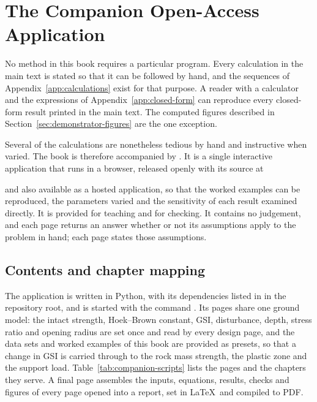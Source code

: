 \chapter{The Companion Open-Access Application}
\label{app:software}

No method in this book requires a particular program. Every calculation in the
main text is stated so that it can be followed by hand, and the sequences of
Appendix~\ref{app:calculations} exist for that purpose. A reader with a calculator and the
expressions of Appendix~\ref{app:closed-form} can reproduce every closed-form
result printed in the main text. The computed figures described in
Section~\ref{sec:demonstrator-figures} are the one exception.

Several of the calculations are nonetheless tedious by hand and instructive when
varied. The book is therefore accompanied by \companionname. It is a single
interactive application that runs in a browser, released openly with its
source at

\begin{center}
\companionlink
\end{center}

\noindent and also available as a hosted application, so that the worked
examples can be reproduced, the parameters varied and the sensitivity of each
result examined directly. It is provided for teaching and for checking. It
contains no judgement, and each page returns an answer whether or not its
assumptions apply to the problem in hand; each page states those assumptions.

\section{Contents and chapter mapping}
\label{sec:companion-contents}

The application is written in Python, with its dependencies listed in
 in the repository root, and is started with the
command . Its pages share one ground model:
the intact strength, Hoek--Brown constant, GSI, disturbance, depth, stress
ratio and opening radius are set once and read by every design page, and the
data sets and worked examples of this book are provided as presets, so that a
change in GSI is carried through to the rock mass strength, the plastic zone
and the support load. Table~\ref{tab:companion-scripts} lists the pages and
the chapters they serve. A final page assembles the inputs, equations, results,
checks and figures of every page opened into a report, set in \LaTeX\ and
compiled to PDF.

